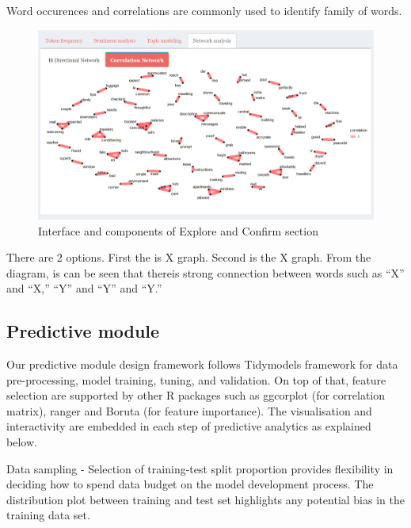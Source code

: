 \documentclass{acm_proc_article-sp}
\begin{document}
Word occurences and correlations are commonly used to identify family of
words.

\begin{figure}[H]

{\centering \includegraphics[width=1\linewidth]{images/correlationnetwork} 

}

\caption{Interface and components of Explore and Confirm section}\label{fig:unnamed-chunk-8}
\end{figure}

There are 2 options. First the is X graph. Second is the X graph. From
the diagram, is can be seen that thereis strong connection between words
such as ``X'' and ``X,'' ``Y'' and ``Y'' and ``Y.''

\hypertarget{predictive-module}{%
\subsection{Predictive module}\label{predictive-module}}

Our predictive module design framework follows Tidymodels framework for
data pre-processing, model training, tuning, and validation. On top of
that, feature selection are supported by other R packages such as
ggcorplot (for correlation matrix), ranger and Boruta (for feature
importance). The visualisation and interactivity are embedded in each
step of predictive analytics as explained below.

Data sampling - Selection of training-test split proportion provides
flexibility in deciding how to spend data budget on the model
development process. The distribution plot between training and test set
highlights any potential bias in the training data set.
\end{document}
